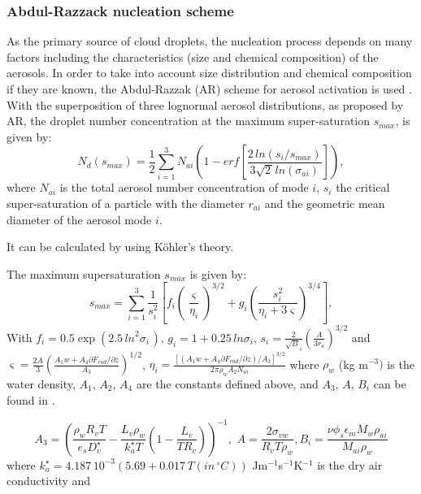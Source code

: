 \subsubsection{Abdul-Razzack nucleation scheme}

As the primary source of cloud droplets, the nucleation process depends on
many factors including the characteristics (size and chemical composition)
of the aerosols. In order to take into account size distribution and
chemical composition if they are known, the Abdul-Razzak (AR) scheme
for aerosol activation is used \cite{Abdul-Razzak:2000}. With the superposition of three
lognormal aerosol distributions, as proposed by AR, the droplet number
concentration at the maximum super-saturation $s_{max}$, is given by:
\begin{equation}
N_{d}\left( s_{max} \right)=\frac{1}{2}\sum\limits_{i=1}^3 {N_{ai}\left(
1-erf\left[ \frac{2\, ln\left( s_{i}/s_{max} \right)}{3\sqrt {2\, } ln\left(
\sigma_{ai} \right)} \right] \right)} ,
\end{equation}
where $N_{ai} $ is the total aerosol number concentration of mode $i$,
$s_{i}$ the critical super-saturation of a particle with the diameter $r_{ai}$ and
the geometric mean diameter of the aerosol mode $i$.

It can be calculated by using K\"{o}hler's theory.

The maximum supersaturation $s_{max} $ is given by:
\begin{equation}
s_{max}=\sum\limits_{i=1}^3 \frac{1}{s_{i}^{2}} \left[ f_{i}\left(
\frac{\varsigma }{\eta_{i}} \right)^{3/2}+g_{i}\left( \frac{s_{i}^{2}}{\eta
_{i}+3\varsigma } \right)^{3/4} \right],
\end{equation}
With $f_{i}=0.5\exp \left( 2.5\, {ln}^{2}\sigma_{i\, } \right),\, g_{i}=1+0.25\, ln\sigma_{i}$,
$s_{i}=\frac{2}{\sqrt B_{i} }\left(\frac{A}{3r_{a}} \right)^{3/2}$
\newline
and $\varsigma =\frac{2A}{3}\left( \frac{A_{1}w+A_{4}\partial
F_{rad}/\partial z}{A_{3}} \right)^{1/2}$, $\eta_{i}=\frac{\left[ \left(
A_{1}w+A_{4}\partial F_{rad}/\partial z \right)/A_{3} \right]^{3/2}}{2\pi
\rho_{w}A_{2}N_{ai}}$
\newline
where $\rho_{w}$ (kg m$^{-3})$ is the water density, $A_{1}$, $A_{2}$,
$A_{4}$ are the constants defined above,
and $A_{3}$, $A$, $B_{i}$ can be found in
 \cite{Abdul-Razzak:2000}.

\begin{equation}
A_{3}=\left( \frac{\rho_{w}R_{v}T}{e_{s}D_{v}^{\star }}-\frac{L_{v}\rho
_{w}}{k_{a}^{\star }T}\left( 1-\frac{L_{v}}{TR_{v}} \right) \right)^{-1},\,
\, A=\frac{2\sigma_{vw}}{R_{v}T\rho_{w}},
B_{i}=\frac{\nu \phi_{s}\epsilon_{m}M_{w}\rho_{ai}}{M_{ai}\rho_{w}}
\end{equation}
where $k_{a}^{\star }=4.187\, {10}^{-3}\left( 5.69+0.017\, T\left( in\,
^{\circ}C \right) \right)$ Jm$^{-1}$s$^{-1}$K$^{-1}$ is the dry air
conductivity and

